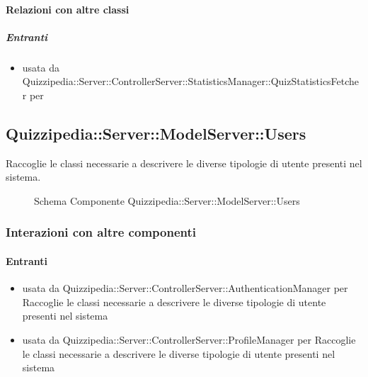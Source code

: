 \paragraph{Relazioni con altre classi}
\subparagraph{Entranti}
\begin{itemize}
\item usata da Quizzipedia::Server::ControllerServer::StatisticsManager::QuizStatisticsFetcher per 
\end{itemize}
\subsection{Quizzipedia::Server::ModelServer::Users}
Raccoglie le classi necessarie a descrivere le diverse tipologie di utente presenti nel sistema.
\begin{figure}[H]
\centering
\noindent{}
\caption[Schema Componente Quizzipedia::Server::ModelServer::Users]{Schema Componente Quizzipedia::Server::ModelServer::Users}
\end{figure}
\subsubsection{Interazioni con altre componenti}
\paragraph{Entranti}
\begin{itemize}
\item usata da Quizzipedia::Server::ControllerServer::AuthenticationManager per Raccoglie le classi necessarie a descrivere le diverse tipologie di utente presenti nel sistema
\item usata da Quizzipedia::Server::ControllerServer::ProfileManager per Raccoglie le classi necessarie a descrivere le diverse tipologie di utente presenti nel sistema
\end{itemize}
